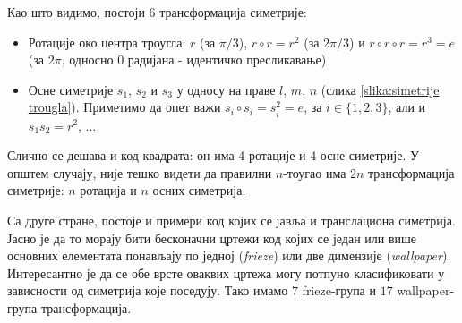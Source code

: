 \documentclass{report}
\theoremstyle{plain}
\theoremstyle{definition}
\begin{document}
Као што видимо, постоји 6 трансформација симетрије: \begin{itemize}
                                                         \item Ротације око центра троугла: $r$ (за $\pi/3$), $r\circ r = r^2$ (за $2\pi/3$) и $r\circ r \circ r = r^3 = e$ (за $2\pi$, односно $0$ радијана - идентичко пресликавање)
                                                         \item Осне симетрије $s_1$, $s_2$ и $s_3$ у односу на праве $l$, $m$, $n$ (слика \ref{slika:simetrije trougla}). Приметимо да опет важи $s_i \circ s_i = s_i^2 = e$, за $i\in \lbrace 1, 2, 3 \rbrace$, али и $s_1 s_2 = r^2$, ...
                                                       \end{itemize}
Слично се дешава и код квадрата: он има 4 ротације и 4 осне симетрије. У општем случају, није тешко видети да правилни $n$-тоугао има $2n$ трансформација симетрије: $n$ ротација и $n$ осних симетрија.

Са друге стране, постоје и примери код којих се јавља и транслациона симетрија. Јасно је да то морају бити бесконачни цртежи код којих се један или више основних елементата понављају по једној (\emph{frieze}) или две димензије (\emph{wallpaper}). Интересантно је да се обе врсте оваквих цртежа могу потпуно класификовати у зависности од симетрија које поседују. Тако имамо $7$ frieze-група и $17$ wallpaper-група трансформација.
\end{document}
